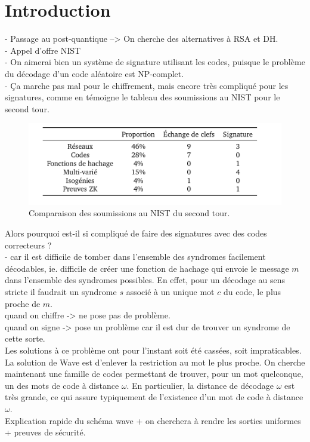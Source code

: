 \documentclass[12pt]{article}
\theoremstyle{plain}
\theoremstyle{definition}
\begin{document}
\newpage
\tableofcontents
\newpage

\section*{Introduction}

- Passage au post-quantique --> On cherche des alternatives à RSA et DH.\\
- Appel d'offre NIST \\
- On aimerai bien un système de signature utilisant les codes, puisque le problème du décodage d'un code aléatoire est NP-complet. \\
- Ça marche pas mal pour le chiffrement, mais encore très compliqué pour les signatures, comme en témoigne le tableau des soumissions au NIST pour le second tour. \\

\begin{figure}[h]
\label{nist 2}
\begin{center}
\includegraphics [scale=0.4]{include/nist_second_tour.png}
\end{center}
\caption{\small Comparaison des soumissions au NIST du second tour.}
\end{figure}
\noindent Alors pourquoi est-il si compliqué de faire des signatures avec des codes correcteurs ? \\
- car il est difficile de tomber dans l'ensemble des syndromes facilement décodables, ie. difficile de créer une fonction de hachage qui envoie le message $m$ dans l'ensemble des syndromes possibles. En effet, pour un décodage au sens stricte il faudrait un syndrome $s$ associé à un unique mot $c$ du code, le plus proche de $m$.\\
quand on chiffre -> ne pose pas de problème. \\
quand on signe -> pose un problème car il est dur de trouver un syndrome de cette sorte. \\
Les solutions à ce problème ont pour l'instant soit été cassées, soit impraticables.\\
La solution de Wave est d'enlever la restriction au mot le plus proche. On cherche maintenant une famille de codes permettant de trouver, pour un mot quelconque, un des mots de code à distance $\omega$. En particulier, la distance de décodage $\omega$ est très grande, ce qui assure typiquement de l’existence d’un mot de code à distance $\omega$.\\
Explication rapide du schéma wave + on cherchera à rendre les sorties uniformes + preuves de sécurité. \\
\end{document}
